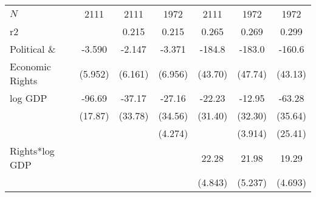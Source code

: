 \documentclass[10pt,letterpaper,subeqn]{beamer}
\begin{document}
\begin{frame}
\begin{table}[htbp]
\begin{tabular}{l*{6}{c}}
\hline
\(N\)       &        2111         &        2111         &        1972         &        2111         &        1972         &        1972         \\
r2          &                     &       0.215         &       0.215         &       0.265         &       0.269         &       0.299         \\
\hline\hline

\multicolumn{1}{p{2cm}}{Political \& }       &      -3.590         &      -2.147         &      -3.371         &      -184.8\sym{***}&      -183.0\sym{***}&      -160.6\sym{***}\\
 Economic Rights          &     (5.952)         &     (6.161)         &     (6.956)         &     (43.70)         &     (47.74)         &     (43.13)         \\

log GDP        &      -96.69\sym{***}&      -37.17         &      -27.16         &      -22.23         &      -12.95         &      -63.28\sym{*}  \\
            &     (17.87)         &     (33.78)         &     (34.56)         &     (31.40)         &     (32.30)         &     (35.64)         \\

            &                     &                     &     (4.274)         &                     &     (3.914)         &     (25.41)         \\

Rights*log GDP    &                     &                     &                     &       22.28\sym{***}&       21.98\sym{***}&       19.29\sym{***}\\
            &                     &                     &                     &     (4.843)         &     (5.237)         &     (4.693)         \\



\end{tabular}
\end{table}
\end{frame}
\end{document}
